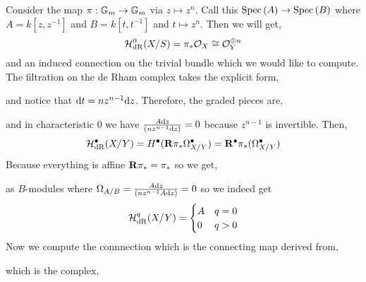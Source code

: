\documentclass[12pt]{article}
\begin{document}
Consider the map $\pi : \mathbb{G}_m \to \mathbb{G}_m$ via $z \mapsto z^n$. Call this $\mathrm{Spec}\left( A \right) \to \mathrm{Spec}\left( B \right)$ where $A = k[z,z^{-1}]$ and $B = k[t,t^{-1}]$ and $t \mapsto z^n$. Then we will get,
\[ \mathcal{H}_{\mathrm{dR}}^0(X/S) = \pi_* \mathcal{O}_{X} \cong \mathcal{O}_{Y}^{\oplus n} \]
and an induced connection on the trivial bundle which we would like to compute. The filtration on the de Rham complex takes the explicit form,
\begin{center}
\end{center}
and notice that $\mathrm{d}{t} = n z^{n-1} \mathrm{d}{z}$. Therefore, the graded pieces are,
\begin{center}
\end{center}
and in characteristic $0$ we have $\frac{A \mathrm{d}{z}}{(n z^{n-1} \mathrm{d}{z})} = 0$ because $z^{n-1}$ is invertible. Then,
\[ \mathcal{H}_{\mathrm{dR}}^\bullet(X/Y) = H^\bullet(\mathbf{R} \pi_* \Omega^\bullet_{X/Y}) = \mathbf{R}^\bullet \pi_*(\Omega^\bullet_{X/Y}) \]
Because everything is affine $\mathbf{R} \pi_* = \pi_*$ so we get,
\begin{center}
\end{center}
as $B$-modules where $\Omega_{A/B} = \frac{A \mathrm{d}{z}}{(n z^{n-1} A \mathrm{d}{z})} = 0$ so we indeed get \[ \mathcal{H}_{\mathrm{dR}}^q(X/Y) = 
\begin{cases}
A & q = 0
\\
0 & q > 0
\end{cases} \] 
Now we compute the connnection which is the connecting map derived from,
\begin{center}
\end{center}
which is the complex,
\begin{center}
\end{center}
\end{document}
